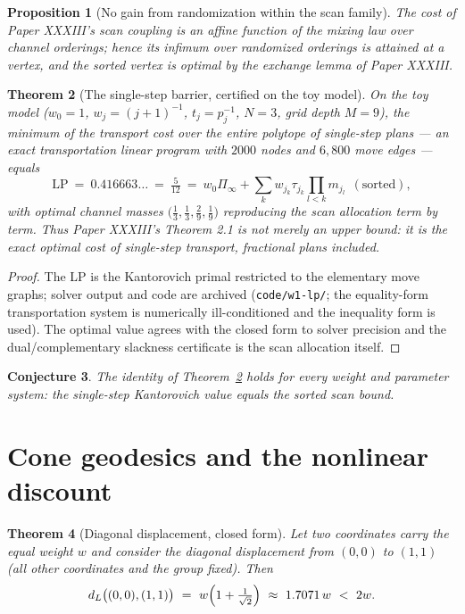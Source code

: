 \documentclass[11pt]{amsart}
\newtheorem{theorem}{Theorem}[section]
\newtheorem{proposition}[theorem]{Proposition}
\newtheorem{conjecture}[theorem]{Conjecture}
\theoremstyle{remark}
\begin{document}
\begin{proposition}[No gain from randomization within the scan family]\label{prop:affine}
The cost of Paper XXXIII's scan coupling is an affine function of the mixing law over
channel orderings; hence its infimum over randomized orderings is attained at a vertex,
and the sorted vertex is optimal by the exchange lemma of Paper XXXIII.
\end{proposition}

\begin{theorem}[The single-step barrier, certified on the toy model]\label{thm:barrier}
On the toy model ($w_0=1$, $w_j=(j{+}1)^{-1}$, $t_j=p_j^{-1}$, $N=3$, grid depth $M=9$),
the minimum of the transport cost over the \emph{entire} polytope of single-step plans
--- an exact transportation linear program with $2000$ nodes and $6{,}800$ move edges ---
equals
\[
\mathrm{LP}\ =\ 0.416663\ldots\ =\ \tfrac{5}{12}\ =\
w_0\Pi_\infty+\sum_kw_{j_k}\tau_{j_k}\prod_{l<k}m_{j_l}\ \ (\text{sorted}),
\]
with optimal channel masses $\bigl(\tfrac13,\tfrac13,\tfrac29,\tfrac19\bigr)$ reproducing
the scan allocation term by term. Thus Paper XXXIII's Theorem 2.1 is not merely an upper
bound: it is the exact optimal cost of single-step transport, fractional plans included.
\end{theorem}

\begin{proof}
The LP is the Kantorovich primal restricted to the elementary move graphs; solver output
and code are archived (\texttt{code/w1-lp/}; the equality-form transportation system is
numerically ill-conditioned and the inequality form is used). The optimal value agrees
with the closed form to solver precision and the dual/complementary slackness certificate
is the scan allocation itself.
\end{proof}

\begin{conjecture}\label{conj:general}
The identity of Theorem~\ref{thm:barrier} holds for every weight and parameter system:
the single-step Kantorovich value equals the sorted scan bound.
\end{conjecture}

\section{Cone geodesics and the nonlinear discount}\label{sec:geodesic}

\begin{theorem}[Diagonal displacement, closed form]\label{thm:diag}
Let two coordinates carry the equal weight $w$ and consider the diagonal displacement
from $(0,0)$ to $(1,1)$ (all other coordinates and the group fixed). Then
\[
d_L\bigl((0,0),(1,1)\bigr)\ =\ w\Bigl(1+\tfrac1{\sqrt2}\Bigr)\ \approx\ 1.7071\,w\ <\ 2w .
\]
\end{theorem}
\end{document}
